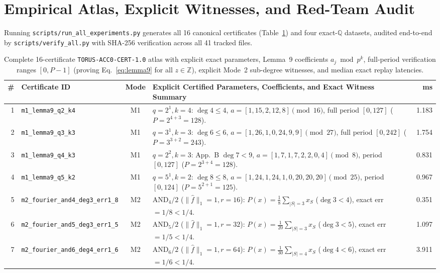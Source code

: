 \documentclass[10pt,twocolumn]{article}
\newcommand{\ZZ}{\mathbb{Z}}
\newcommand{\QQ}{\mathbb{Q}}
\begin{document}
\section{Empirical Atlas, Explicit Witnesses, and Red-Team Audit}\label{sec:results}
Running \texttt{scripts/run\_all\_experiments.py} generates all 16 canonical certificates (Table~\ref{tab:atlas}) and four exact-$\QQ$ datasets, audited end-to-end by \texttt{scripts/verify\_all.py} with SHA-256 verification across all 41 tracked files.

\begin{table}[t]
\centering
\caption{Complete 16-certificate \texttt{TORUS-ACC0-CERT-1.0} atlas with explicit exact parameters, Lemma~9 coefficients $a_j \bmod p^k$, full-period verification ranges $[0, P{-}1]$ (proving Eq.~\eqref{eq:lemma9} for all $z\in\ZZ$), explicit Mode~2 sub-degree witnesses, and median exact replay latencies.}
\label{tab:atlas}
\scriptsize
\setlength{\tabcolsep}{2.6pt}
\begin{tabular}{@{}r l c p{10.4cm} r@{}}
\toprule
\# & Certificate ID & Mode & Explicit Certified Parameters, Coefficients, and Exact Witness Summary & ms \\
\midrule
1 & \texttt{m1\_lemma9\_q2\_k4} & M1 & $q{=}2^1,k{=}4$: $\deg 4\le 4$, $a=[1,15,2,12,8]\pmod{16}$, full period $[0,127]$ ($P{=}2^{4+3}{=}128$). & 1.183 \\
2 & \texttt{m1\_lemma9\_q3\_k3} & M1 & $q{=}3^1,k{=}3$: $\deg 6\le 6$, $a=[1,26,1,0,24,9,9]\pmod{27}$, full period $[0,242]$ ($P{=}3^{3+2}{=}243$). & 1.754 \\
3 & \texttt{m1\_lemma9\_q4\_k3} & M1 & $q{=}2^2,k{=}3$: App.~B $\deg 7 < 9$, $a=[1,7,1,7,2,2,0,4]\pmod 8$, period $[0,127]$ ($P{=}2^{3+4}{=}128$). & 0.831 \\
4 & \texttt{m1\_lemma9\_q5\_k2} & M1 & $q{=}5^1,k{=}2$: $\deg 8\le 8$, $a=[1,24,1,24,1,0,20,20,20]\pmod{25}$, period $[0,124]$ ($P{=}5^{2+1}{=}125$). & 0.967 \\
\midrule
5 & \texttt{m2\_fourier\_and4\_deg3\_err1\_8} & M2 & $\mathrm{AND}_4/2$ ($\|\hat f\|_1{=}1, r{=}16$): $P(x)=\frac18\sum_{|S|=3} x_S$ ($\deg 3<4$), exact err $=1/8 < 1/4$. & 0.351 \\
6 & \texttt{m2\_fourier\_and5\_deg3\_err1\_5} & M2 & $\mathrm{AND}_5/2$ ($\|\hat f\|_1{=}1, r{=}32$): $P(x)=\frac{1}{20}\sum_{|S|=3} x_S$ ($\deg 3<5$), exact err $=1/5 < 1/4$. & 1.097 \\
7 & \texttt{m2\_fourier\_and6\_deg4\_err1\_6} & M2 & $\mathrm{AND}_6/2$ ($\|\hat f\|_1{=}1, r{=}64$): $P(x)=\frac{1}{30}\sum_{|S|=4} x_S$ ($\deg 4<6$), exact err $=1/6 < 1/4$. & 3.911 \\

\end{tabular}
\end{table}
\end{document}
